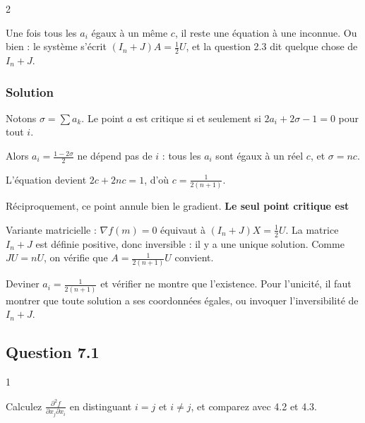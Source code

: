 \documentclass[11pt,a4paper]{article}
\newcommand{\equationajustee}[1]{%
  \sbox{\boiteequation}{$\displaystyle #1$}%
  \ifdim\wd\boiteequation>\linewidth
    \[\resizebox{\linewidth}{!}{\usebox{\boiteequation}}\]%
  \else
    \[#1\]%
  \fi}
\begin{document}
\begin{indication}{2}

Une fois tous les \(a_i\) égaux à un même \(c\), il reste une équation à une inconnue. Ou bien : le système s'écrit \((I_n+J)A=\frac12U\), et la question 2.3 dit quelque chose de \(I_n+J\).

\end{indication}

\hypertarget{solution-9}{%
\subsubsection{Solution}\label{solution-9}}

Notons \(\sigma=\sum a_k\). Le point \(a\) est critique si et seulement si \(2a_i+2\sigma-1=0\) pour tout \(i\).

Alors \(a_i=\frac{1-2\sigma}2\) ne dépend pas de \(i\) : tous les \(a_i\) sont égaux à un réel \(c\), et \(\sigma=nc\).

L'équation devient \(2c+2nc=1\), d'où \(c=\frac1{2(n+1)}\).

Réciproquement, ce point annule bien le gradient. \textbf{Le seul point critique est}

\equationajustee{a=\Bigl(\frac1{2(n+1)},\dots,\frac1{2(n+1)}\Bigr).}

\begin{methode}

Variante matricielle : \(\nabla f(m)=0\) équivaut à \((I_n+J)X=\frac12U\). La matrice \(I_n+J\) est définie positive, donc inversible : il y a une unique solution. Comme \(JU=nU\), on vérifie que \(A=\frac1{2(n+1)}U\) convient.

\end{methode}

\begin{piege}

Deviner \(a_i=\frac1{2(n+1)}\) et vérifier ne montre que l'existence. Pour l'unicité, il faut montrer que toute solution a ses coordonnées égales, ou invoquer l'inversibilité de \(I_n+J\).

\end{piege}

\hypertarget{question-7.1}{%
\subsection{Question 7.1}\label{question-7.1}}

\begin{indication}{1}

Calculez \(\frac{\partial^2 f}{\partial x_j\partial x_i}\) en distinguant \(i=j\) et \(i\neq j\), et comparez avec 4.2 et 4.3.

\end{indication}
\end{document}
